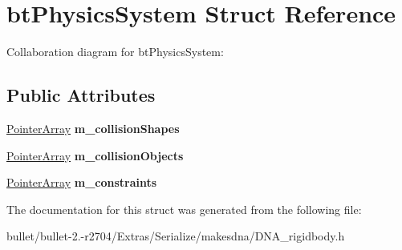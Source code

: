 \hypertarget{structbt_physics_system}{\section{bt\+Physics\+System Struct Reference}
\label{structbt_physics_system}
}


Collaboration diagram for bt\+Physics\+System\+:
\subsection*{Public Attributes}
\begin{DoxyCompactItemize}
\item 
\hypertarget{structbt_physics_system_ab9f3519f8469bd1a38d7d7a408d24130}{\hyperlink{struct_pointer_array}{Pointer\+Array} {\bfseries m\+\_\+collision\+Shapes}}\label{structbt_physics_system_ab9f3519f8469bd1a38d7d7a408d24130}

\item 
\hypertarget{structbt_physics_system_a64ad9a7e59dac38ffba4e774a973b369}{\hyperlink{struct_pointer_array}{Pointer\+Array} {\bfseries m\+\_\+collision\+Objects}}\label{structbt_physics_system_a64ad9a7e59dac38ffba4e774a973b369}

\item 
\hypertarget{structbt_physics_system_a3b1c7fb8d4f607f8e7bd594c3c7ab9e1}{\hyperlink{struct_pointer_array}{Pointer\+Array} {\bfseries m\+\_\+constraints}}\label{structbt_physics_system_a3b1c7fb8d4f607f8e7bd594c3c7ab9e1}

\end{DoxyCompactItemize}


The documentation for this struct was generated from the following file\+:\begin{DoxyCompactItemize}
\item 
bullet/bullet-\/2.-\/r2704/\+Extras/\+Serialize/makesdna/D\+N\+A\+\_\+rigidbody.\+h\end{DoxyCompactItemize}
